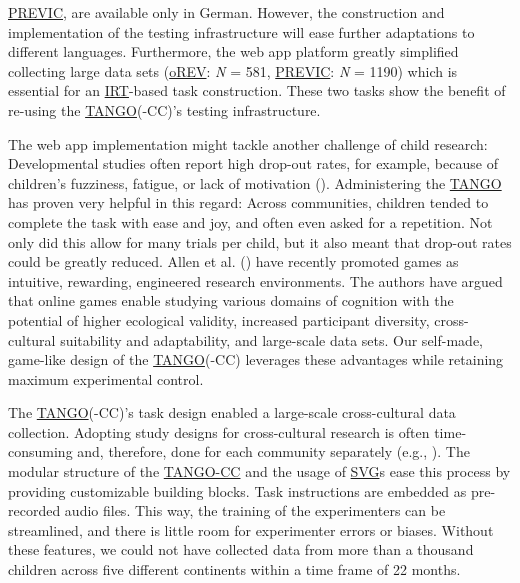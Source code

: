 \documentclass[
]{scrbook}
\begin{document}
\hyperref[acronyms_PREVIC]{PREVIC}, are available only in German. However, the construction and implementation of the testing infrastructure will ease further adaptations to different languages. Furthermore, the web app platform greatly simplified collecting large data sets (\hyperref[acronyms_oREV]{oREV}: \emph{N} = 581, \hyperref[acronyms_PREVIC]{PREVIC}: \emph{N} = 1190) which is essential for an \hyperref[acronyms_IRT]{IRT}-based task construction. These two tasks show the benefit of re-using the \hyperref[acronyms_TANGO]{TANGO}(-CC)'s testing infrastructure.

The web app implementation might tackle another challenge of child research: Developmental studies often report high drop-out rates, for example, because of children's fuzziness, fatigue, or lack of motivation (). Administering the \hyperref[acronyms_TANGO]{TANGO} has proven very helpful in this regard: Across communities, children tended to complete the task with ease and joy, and often even asked for a repetition. Not only did this allow for many trials per child, but it also meant that drop-out rates could be greatly reduced. Allen et al. () have recently promoted games as intuitive, rewarding, engineered research environments. The authors have argued that online games enable studying various domains of cognition with the potential of higher ecological validity, increased participant diversity, cross-cultural suitability and adaptability, and large-scale data sets. Our self-made, game-like design of the \hyperref[acronyms_TANGO]{TANGO}(-CC) leverages these advantages while retaining maximum experimental control.

The \hyperref[acronyms_TANGO]{TANGO}(-CC)'s task design enabled a large-scale cross-cultural data collection. Adopting study designs for cross-cultural research is often time-consuming and, therefore, done for each community separately (e.g., ). The modular structure of the \hyperref[acronyms_TANGO-CC]{TANGO-CC} and the usage of \hyperref[acronyms_SVG]{SVG}s ease this process by providing customizable building blocks. Task instructions are embedded as pre-recorded audio files. This way, the training of the experimenters can be streamlined, and there is little room for experimenter errors or biases. Without these features, we could not have collected data from more than a thousand children across five different continents within a time frame of 22 months.
\end{document}
